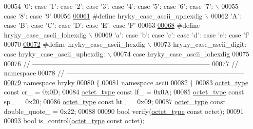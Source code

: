 \begin{DoxyCode}
{00054 \textcolor{preprocessor}{    '0': case '1': case '2': case '3': case '4': case '5': case '6': case '7': 
      \(\backslash\)}
00055 \textcolor{preprocessor}{case '8': case '9'}
00056 \textcolor{preprocessor}{}
\hypertarget{ascii__common_8h_source_l00061}{}\hyperlink{ascii__common_8h_a0cc0876b6139ba610ca15e1319961510}{00061} \textcolor{preprocessor}{#define hryky\_case\_ascii\_uphexdig \(\backslash\)}
00062 \textcolor{preprocessor}{    'A': case 'B': case 'C': case 'D': case 'E': case 'F'}
00063 \textcolor{preprocessor}{}
\hypertarget{ascii__common_8h_source_l00068}{}\hyperlink{ascii__common_8h_a0fb932e22325e0f21f3be2f369882583}{00068} \textcolor{preprocessor}{#define hryky\_case\_ascii\_lohexdig \(\backslash\)}
00069 \textcolor{preprocessor}{    'a': case 'b': case 'c': case 'd': case 'e': case 'f'}
00070 \textcolor{preprocessor}{}
\hypertarget{ascii__common_8h_source_l00072}{}\hyperlink{ascii__common_8h_a06a569e9665ef789619ee5e5e34e9e0d}{00072} \textcolor{preprocessor}{#define hryky\_case\_ascii\_hexdig \(\backslash\)}
00073 \textcolor{preprocessor}{hryky\_case\_ascii\_digit: case hryky\_case\_ascii\_uphexdig: \(\backslash\)}
00074 \textcolor{preprocessor}{case hryky\_case\_ascii\_lohexdig}
00075 \textcolor{preprocessor}{}
00076 \textcolor{comment}{//
      ------------------------------------------------------------------------------}
00077 \textcolor{comment}{// namespace}
00078 \textcolor{comment}{//
      ------------------------------------------------------------------------------}
\hypertarget{ascii__common_8h_source_l00079}{}\hyperlink{namespacehryky}{00079} \textcolor{keyword}{namespace }hryky
00080 \{
00081 \textcolor{keyword}{namespace }ascii
00082 \{
00083     \hyperlink{namespacehryky_a488cba8b666be33ccca70e819684e3c8}{octet_type} \textcolor{keyword}{const} cr\_            = 0x0D;
00084     \hyperlink{namespacehryky_a488cba8b666be33ccca70e819684e3c8}{octet_type} \textcolor{keyword}{const} lf\_            = 0x0A;
00085     \hyperlink{namespacehryky_a488cba8b666be33ccca70e819684e3c8}{octet_type} \textcolor{keyword}{const} sp\_            = 0x20;
00086     \hyperlink{namespacehryky_a488cba8b666be33ccca70e819684e3c8}{octet_type} \textcolor{keyword}{const} ht\_            = 0x09;
00087     \hyperlink{namespacehryky_a488cba8b666be33ccca70e819684e3c8}{octet_type} \textcolor{keyword}{const} double\_quote\_  = 0x22;
00088     
00090     \textcolor{keywordtype}{bool} verify(\hyperlink{namespacehryky_a488cba8b666be33ccca70e819684e3c8}{octet_type} \textcolor{keyword}{const} octet);
00091 
00093     \textcolor{keywordtype}{bool} is\_control(\hyperlink{namespacehryky_a488cba8b666be33ccca70e819684e3c8}{octet_type} \textcolor{keyword}{const} octet);
}
\end{DoxyCode}
